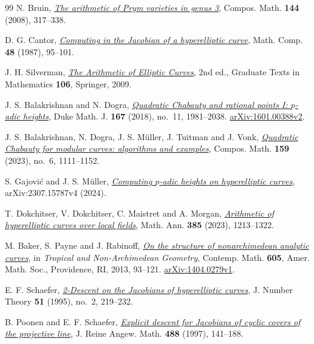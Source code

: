 \begin{thebibliography}{99}
N. Bruin, \href{https://doi.org/10.1112/S0010437X07003314}{\emph{The arithmetic of Prym varieties in genus 3}}, Compos. Math. \textbf{144} (2008), 317--338.

D. G. Cantor, \href{https://doi.org/10.1090/S0025-5718-1987-0866101-0}{\emph{Computing in the Jacobian of a hyperelliptic curve}}, Math. Comp. \textbf{48} (1987), 95--101.

J. H. Silverman, \href{https://doi.org/10.1007/978-0-387-09494-6}{\emph{The Arithmetic of Elliptic Curves}}, 2nd ed., Graduate Texts in Mathematics \textbf{106}, Springer, 2009.

J. S. Balakrishnan and N. Dogra,
\href{https://doi.org/10.1215/00127094-2018-0013}{\emph{Quadratic Chabauty and rational points I: $p$-adic heights}},
Duke Math. J. \textbf{167} (2018), no.~11, 1981--2038. \href{https://arxiv.org/abs/1601.00388v2}{arXiv:1601.00388v2}.

J. S. Balakrishnan, N. Dogra, J. S. M\"uller, J. Tuitman and J. Vonk,
\href{https://doi.org/10.1112/S0010437X23007170}{\emph{Quadratic Chabauty for modular curves: algorithms and examples}},
Compos. Math. \textbf{159} (2023), no.~6, 1111--1152.

S. Gajovi\'c and J. S. M\"uller,
\href{https://arxiv.org/abs/2307.15787v4}{\emph{Computing $p$-adic heights on hyperelliptic curves}}, arXiv:2307.15787v4 (2024).

T. Dokchitser, V. Dokchitser, C. Maistret and A. Morgan,
\href{https://doi.org/10.1007/s00208-021-02319-y}{\emph{Arithmetic of hyperelliptic curves over local fields}},
Math. Ann. \textbf{385} (2023), 1213--1322.

M. Baker, S. Payne and J. Rabinoff,
\href{https://doi.org/10.1090/conm/605/12113}{\emph{On the structure of nonarchimedean analytic curves}},
in \emph{Tropical and Non-Archimedean Geometry},
Contemp. Math. \textbf{605}, Amer. Math. Soc., Providence, RI, 2013,
93--121. \href{https://arxiv.org/abs/1404.0279v1}{arXiv:1404.0279v1}.

E. F. Schaefer,
\href{https://doi.org/10.1006/jnth.1995.1044}{\emph{2-Descent on the Jacobians of hyperelliptic curves}},
J. Number Theory \textbf{51} (1995), no.~2, 219--232.

B. Poonen and E. F. Schaefer,
\href{https://math.mit.edu/~poonen/papers/descent.pdf}{\emph{Explicit descent for Jacobians of cyclic covers of the projective line}},
J. Reine Angew. Math. \textbf{488} (1997), 141--188.


\end{thebibliography}
